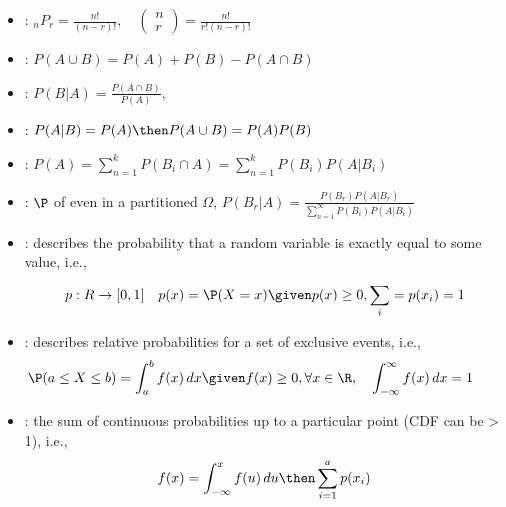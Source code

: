 \documentclass[basic]{nosvagor-notes}
\begin{document}


  \begin{itemize}
    \item {}: \(\displaystyle  {}_nP_r = \frac{n!}{(n-r)!}, \quad
      \begin{pmatrix} n \\ r \end{pmatrix} = \frac{n!}{r!(n-r)!}
      \)

    \item {}: \(P(A \cup B) = P(A) + P(B) - P(A \cap B)\)

    \item {}: \(\displaystyle P(B|A) = \frac{P(A \cap
      B)}{P(A)},\)

    \item {}: \(P(A|B) = P(A) \then P(A \cup B) = P(A)P(B)\)

    \item {}: \(\displaystyle P(A) = \sum_{n=1}^{k} P(B_i
      \cap A) = \sum_{n=1}^{k} P(B_i)P(A|B_i)\)

    \item {}: \(\P\) of even in a partitioned \(\Omega\), \(\displaystyle  P(B_r|A) = \frac{P(B_r)P(A|B_r)}{\sum_{n=1}^{\infty} P(B_i)P(A|B_i)}\)

  \end{itemize}

  \hrulefill

  \begin{itemize}
    \item {}: describes the probability that a
       random variable is exactly equal to some value, i.e.,
      \[%
        p : R \to [0,1] \quad  p(x) = \P(X = x) \given p(x) \geq 0, \sum_{i}^{} = p(x_i) = 1
      \]%

    \item {}: describes relative probabilities
      for a set of exclusive  events, i.e.,
      \[%
        \hspace{-2em}
        \P(a \leq X \leq b) = \int_{a}^{b} f(x)\,dx \given
        f(x) \geq 0, \forall x \in \R, \quad
        \displaystyle \int_{-\infty}^{\infty} f(x)\,dx = 1
      \]%

    \item {}: the sum of continuous probabilities
      up to a particular point (CDF can be > 1), i.e.,
      \[%
        f(x) = \int_{-\infty}^{x} f(u)\, du \then \sum_{i=1}^{a} p(x_i)
      \]%

  \end{itemize}
\end{document}
